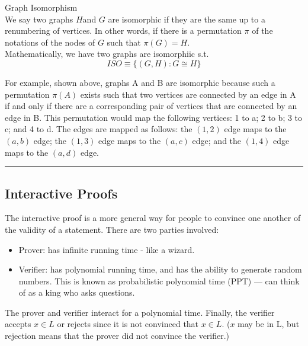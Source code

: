 \documentclass[twoside]{article}
\newenvironment{example}{{\bf Example:}}{\hfill\rule{2mm}{2mm}}
\begin{document}
\begin{example}
Graph Isomorphism\\

We say two graphs $H$and $G$ are isomorphic if they are the same up to a renumbering of vertices. In other words, if there is a permutation $\pi$ of the notations of the nodes of $G$ such that $\pi(G) =H$.\\
Mathematically, we have two graphs are isomorphiic s.t. $$ISO  \equiv \{ (G,H) : G  \cong H \}$$

\begin{figure}[!htp]
\centering
{}
\qquad
{}
\label{fig:iso}
\end{figure}

For example, shown above, graphs A and B are isomorphic because such a permutation $\pi(A)$ exists such that two vertices are connected by an edge in A if and only if there are a corresponding pair of vertices that are connected by an edge in B. 
This permutation would map the following vertices: 1 to a; 2 to b; 3 to c; and 4 to d. 
The edges are mapped as follows: the $(1,2)$ edge maps to the $(a,b)$ edge; the $(1,3)$ edge maps to the $(a,c)$ edge; and the $(1,4)$ edge maps to the $(a,d)$ edge.

\end{example}


\subsection{Interactive Proofs}

The interactive proof is a more general way for people to convince one another of the validity of a statement. 
There are two parties involved:
\begin{itemize}
\item Prover: has infinite running time - like a wizard.
\item  Verifier: has polynomial running time, and has the ability to generate random numbers. This is known as probabilistic polynomial time (PPT) --- can think of as a king who asks questions.
\end{itemize}
The prover and verifier interact for a polynomial time. Finally, the verifier accepts $x \in L$ or rejects since it is not convinced that $x \in L$. ($x$ may be in L, but rejection means that the prover did not convince the verifier.)
\end{document}

